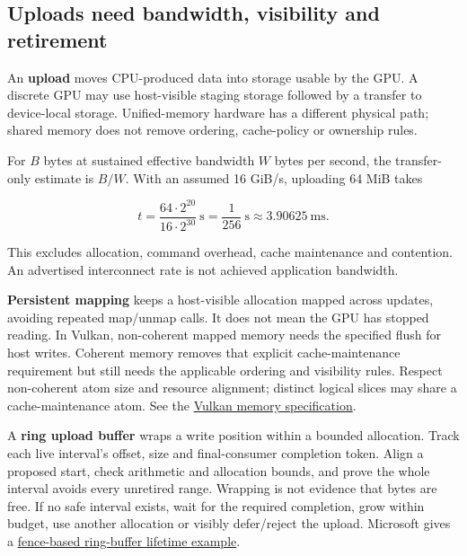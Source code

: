 \subsection{Uploads need bandwidth, visibility and retirement}\label{03-visual-computing-i-ch016-uploads-need-bandwidth-visibility-and-retirement}

\hypertarget{03-visual-computing-i-ch016-uploads-need-bandwidth-visibility-and-retirement}{}

An \textbf{upload} moves CPU-produced data into storage usable by the GPU. A discrete GPU may use host-visible staging storage followed by a transfer to device-local storage. Unified-memory hardware has a different physical path; shared memory does not remove ordering, cache-policy or ownership rules.

For \(B\) bytes at sustained effective bandwidth \(W\) bytes per second, the transfer-only estimate is \(B/W\). With an assumed 16 GiB/s, uploading 64 MiB takes

\[
t=\frac{64\cdot2^{20}}{16\cdot2^{30}}\ \mathrm{s}
 =\frac1{256}\ \mathrm{s}\approx3.90625\ \mathrm{ms}.
\]

This excludes allocation, command overhead, cache maintenance and contention. An advertised interconnect rate is not achieved application bandwidth.

\textbf{Persistent mapping} keeps a host-visible allocation mapped across updates, avoiding repeated map/unmap calls. It does not mean the GPU has stopped reading. In Vulkan, non-coherent mapped memory needs the specified flush for host writes. Coherent memory removes that explicit cache-maintenance requirement but still needs the applicable ordering and visibility rules. Respect non-coherent atom size and resource alignment; distinct logical slices may share a cache-maintenance atom. See the \href{https://docs.vulkan.org/spec/latest/chapters/memory.html}{Vulkan memory specification}.

A \textbf{ring upload buffer} wraps a write position within a bounded allocation. Track each live interval's offset, size and final-consumer completion token. Align a proposed start, check arithmetic and allocation bounds, and prove the whole interval avoids every unretired range. Wrapping is not evidence that bytes are free. If no safe interval exists, wait for the required completion, grow within budget, use another allocation or visibly defer/reject the upload. Microsoft gives a \href{https://learn.microsoft.com/en-us/windows/win32/direct3d12/fence-based-resource-management}{fence-based ring-buffer lifetime example}.

